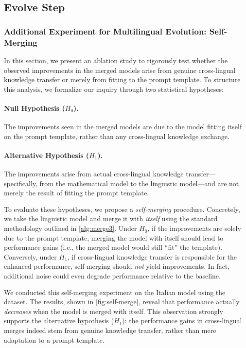 \subsection{Evolve Step} 

\subsubsection{Additional Experiment for Multilingual Evolution: Self-Merging}
\label{app:add-exp-self-merging}

In this section, we present an ablation study to rigorously test whether the observed improvements in the merged models arise from genuine cross-lingual knowledge transfer or merely from fitting to the prompt template. To structure this analysis, we formalize our inquiry through two statistical hypotheses:

\paragraph{Null Hypothesis ($H_0$).} The improvements seen in the merged models are due to the model fitting itself on the prompt template, rather than any cross-lingual knowledge exchange.

\paragraph{Alternative Hypothesis ($H_1$).} The improvements arise from actual cross-lingual knowledge transfer---specifically, from the mathematical model to the linguistic model---and are not merely the result of fitting the prompt template.

To evaluate these hypotheses, we propose a \emph{self-merging} procedure. Concretely, we take the linguistic model and merge it with \emph{itself} using the standard \approach methodology outlined in \cref{alg:merge3}. Under $H_0$, if the improvements are solely due to the prompt template, merging the model with itself should lead to performance gains (i.e., the merged model would still ``fit'' the template). Conversely, under $H_1$, if cross-lingual knowledge transfer is responsible for the enhanced performance, self-merging should \emph{not} yield improvements. In fact, additional noise could even degrade performance relative to the baseline.

We conducted this self-merging experiment on the Italian model using the  dataset. The results, shown in \cref{fig:self-merge}, reveal that performance actually \emph{decreases} when the model is merged with itself. This observation strongly supports the alternative hypothesis ($H_1$): the performance gains in cross-lingual merges indeed stem from genuine knowledge transfer, rather than mere adaptation to a prompt template.

